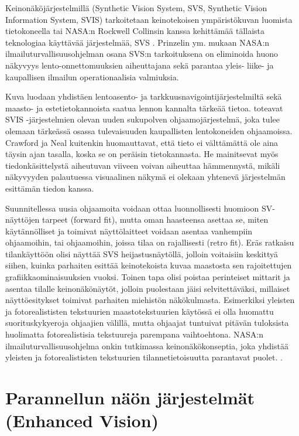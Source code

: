 \documentclass[utf8,bachelor,manualbib]{gradu3}
\begin{document}
Keinonäköjärjestelmillä (Synthetic Vision System, SVS, Synthetic Vision Information System, SVIS) tarkoitetaan keinotekoisen ympäristökuvan luomista  tietokoneella \citep{baileyym2007} tai NASA:n Rockwell Collinsin kanssa kehittämää tällaista teknologiaa käyttävää järjestelmää, SVS \citep{crawfordneal2006}. Prinzelin ym. \citeyearpar{prinzel2004} mukaan NASA:n ilmailuturvallisuusohjelman osana SVS:n tarkoituksena on eliminoida huono näkyvyys lento-onnettomuuksien aiheuttajana sekä parantaa yleis- liike- ja kaupallisen ilmailun operationaalisia valmiuksia.

Kuva luodaan yhdistäen lentoasento- ja tarkkuusnavigointijärjestelmiltä sekä maasto- ja estetietokannoista saatua lennon kannalta tärkeää tietoa. \cite{schnellym2004} toteavat SVIS -järjestelmien olevan uuden sukupolven ohjaamojärjestelmä, joka tulee olemaan tärkeässä osassa tulevaisuuden kaupallisten lentokoneiden ohjaamoissa. Crawford ja Neal kuitenkin \citeyearpar{crawfordneal2006} huomauttavat, että tieto ei välttämättä ole aina täysin ajan tasalla, koska se on peräisin tietokannasta. He mainitsevat myös tiedonkäsittelystä aiheutuvan viiveen voivan aiheuttaa hämmennystä, mikäli näkyvyyden palautuessa visuaalinen näkymä ei olekaan yhtenevä järjestelmän esittämän tiedon kanssa.

Suunnitellessa uusia ohjaamoita voidaan ottaa luonnollisesti huomioon SV-näyttöjen tarpeet (forward fit), mutta oman haasteensa asettaa se, miten käytännölliset ja toimivat näyttölaitteet voidaan asentaa vanhempiin ohjaamoihin, tai ohjaamoihin, joissa tilaa on rajallisesti (retro fit). Eräs ratkaisu tilankäyttöön olisi näyttää SVS heijastusnäytöllä, jolloin voitaisiin keskittyä siihen, kuinka parhaiten esittää keinotekoista kuvaa maastosta sen rajoitettujen grafiikkaominaisuuksien vuoksi. Toinen tapa olisi poistaa perinteiset mittarit ja asentaa tilalle keinonäkönäytöt, jolloin puolestaan jäisi selvitettäväksi, millaiset näyttöesitykset toimivat parhaiten miehistön näkökulmasta. Esimerkiksi yleisten ja fotorealististen tekstuurien maastotekstuurien käytössä ei olla huomattu suorituskykyeroja ohjaajien välillä, mutta ohjaajat tuntuivat pitävän tuloksista huolimatta fotorealistisia tekstuureja parempana vaihtoehtona. NASA:n ilmailuturvallisuusohjelma onkin tutkimassa keinonäkökonseptia, joka yhdistää yleisten ja fotorealististen tekstuurien tilannetietoisuutta parantavat puolet. \citep{prinzel2004}.

\section{Parannellun näön järjestelmät (Enhanced Vision)}
\end{document}
